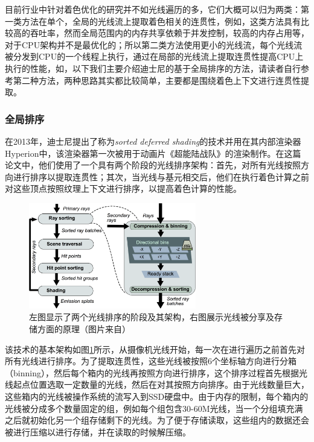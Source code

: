 目前行业中针对着色优化的研究并不如光线遍历的多，它们大概可以归为两类：第一类方法在单个，全局的光线流上提取着色相关的连贯性，例如\cite{a:SortedDeferredShadingforProductionPathTracing}，这类方法具有比较高的吞吐率，然而全局范围内的内存共享依赖于并发控制，较高的内存占用等，对于CPU架构并不是最优化的；所以第二类方法使用更小的光线流，每个光线流被分发到CPU的一个线程上执行，通过在局部的光线流上提取连贯性提高CPU上执行的性能，如\cite{a:LocalShadingCoherenceExtractionforSIMD-EfficientPathTracingonCPUs}，以下我们主要介绍迪士尼的基于全局排序的方法，请读者自行参考第二种方法，两种思路其实都比较简单，主要都是围绕着色上下文进行连贯性提取。






\subsubsection{全局排序} 
在2013年，迪士尼提出了称为\textit{sorted deferred shading}\cite{a:SortedDeferredShadingforProductionPathTracing}的技术并用在其内部渲染器Hyperion中，该渲染器第一次被用于动画片《超能陆战队》的渲染制作。在这篇论文中，他们使用了一个具有两个阶段的光线排序架构：首先，对所有光线按照方向进行排序以提取连贯性；其次，当光线与基元相交后，他们在执行着色计算之前对这些顶点按照纹理上下文进行排序，以提高着色计算的性能。

\begin{figure}
\sidecaption
	\includegraphics[width=0.65\textwidth]{figures/pt/path-10}
	\caption{左图显示了两个光线排序的阶段及其架构，右图展示光线被分享及存储方面的原理（图片来自\cite{a:SortedDeferredShadingforProductionPathTracing}）}
	\label{f:pt-sorted-deferred-shading}
\end{figure}

该技术的基本架构如图\ref{f:pt-sorted-deferred-shading}所示，从摄像机光线开始，每一次在进行遍历之前首先对所有光线进行排序。为了提取连贯性，这些光线被按照6个坐标轴方向进行分箱（binning），然后每个箱内的光线再按照方向进行排序，这个排序过程首先根据光线起点位置选取一定数量的光线，然后在对其按照方向排序。由于光线数量巨大，这些箱内的光线被操作系统的流写入到SSD硬盘中。由于内存的限制，每个箱内的光线被分成多个数量固定的组，例如每个组包含30-60M光线，当一个分组填充满之后就初始化另一个组存储剩下的光线。为了便于存储读取，这些组内的数据还会被进行压缩以进行存储，并在读取的时候解压缩。

